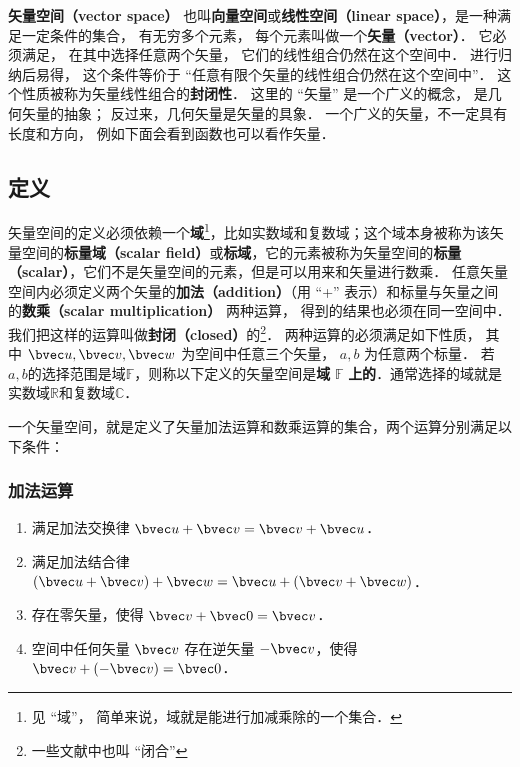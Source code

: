


\textbf{矢量空间（vector space）} 也叫\textbf{向量空间}或\textbf{线性空间（linear space）}，是一种满足一定条件的集合， 有无穷多个元素， 每个元素叫做一个\textbf{矢量（vector）}． 它必须满足， 在其中选择任意两个矢量， 它们的线性组合仍然在这个空间中． 进行归纳后易得， 这个条件等价于 “任意有限个矢量的线性组合仍然在这个空间中”． 这个性质被称为矢量线性组合的\textbf{封闭性}． 这里的 “矢量” 是一个广义的概念， 是几何矢量的抽象； 反过来，几何矢量是矢量的具象． 一个广义的矢量，不一定具有长度和方向， 例如下面会看到函数也可以看作矢量．

\subsection{定义}
矢量空间的定义必须依赖一个\textbf{域}\footnote{见 “域”， 简单来说，域就是能进行加减乘除的一个集合．}，比如实数域和复数域；这个域本身被称为该矢量空间的\textbf{标量域（scalar field）}或\textbf{标域}，它的元素被称为矢量空间的\textbf{标量（scalar）}，它们不是矢量空间的元素，但是可以用来和矢量进行数乘． 任意矢量空间内必须定义两个矢量的\textbf{加法（addition）}（用 “+” 表示）和标量与矢量之间的\textbf{数乘（scalar multiplication）} 两种运算， 得到的结果也必须在同一空间中． 我们把这样的运算叫做\textbf{封闭（closed）}的\footnote{一些文献中也叫 “闭合”}． 两种运算的必须满足如下性质， 其中 $\bvec u,\bvec v,\bvec w$ 为空间中任意三个矢量， $a,b$ 为任意两个标量． 若$a,b$的选择范围是域$\mathbb{F}$，则称以下定义的矢量空间是\textbf{域} $\mathbb{F}$ \textbf{上的}．通常选择的域就是实数域$\mathbb{R}$和复数域$\mathbb{C}$．

一个矢量空间，就是定义了矢量加法运算和数乘运算的集合，两个运算分别满足以下条件：

\subsubsection{加法运算}
\begin{enumerate}
\item 满足加法交换律 $\bvec u + \bvec v = \bvec v + \bvec u$．
\item 满足加法结合律 $(\bvec u + \bvec v) + \bvec w = \bvec u + (\bvec v + \bvec w)$．
\item 存在零矢量，使得 $\bvec v + \bvec 0 = \bvec v$．
\item 空间中任何矢量 $\bvec v$ 存在逆矢量 $-\bvec v$，使得 $\bvec v + (-\bvec v) = \bvec 0$．
\end{enumerate}

